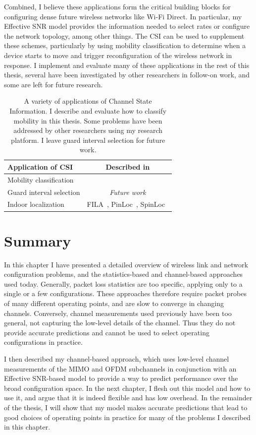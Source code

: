 Combined, I believe these applications form the critical building blocks for configuring dense future wireless networks like Wi-Fi Direct. In particular, my Effective SNR model provides the information needed to select rates or configure the network topology, among other things. The CSI can be used to supplement these schemes, particularly by using mobility classification to determine when a device starts to move and trigger reconfiguration of the wireless network in response. I implement and evaluate many of these applications in the rest of this thesis, several have been investigated by other researchers in follow-on work, and some are left for future research.

\begin{table}[tp]
	\centering
	\begin{tabular}{lc}
	\toprule
		Application of CSI & Described in \\
	\midrule
		Mobility classification & \chapref{chap:applications}\\
	    Guard interval selection & \emph{Future work}\\
		Indoor localization & FILA~\cite{Wu_FILA}, PinLoc~\cite{Sen_PinLoc}, SpinLoc~\cite{Sen_SpinLoc} \\ 
	\bottomrule
	\end{tabular}
	\caption[A variety of applications of Channel State Information]{\label{tab:csi_uses}A variety of applications of Channel State Information. I describe and evaluate how to classify mobility in this thesis. Some problems have been addressed by other researchers using my research platform. I leave guard interval selection for future work.}
\end{table}

\section{Summary}
In this chapter I have presented a detailed overview of wireless link and network configuration problems, and the statistics-based and channel-based approaches used today. Generally, packet loss statistics are too specific, applying only to a single or a few configurations. These approaches therefore require packet probes of many different operating points, and are slow to converge in changing channels. Conversely, channel measurements used previously have been too general, not capturing the low-level details of the channel. Thus they do not provide accurate predictions and cannot be used to select operating configurations in practice.

I then described my channel-based approach, which uses low-level channel measurements of the MIMO and OFDM subchannels in conjunction with an Effective SNR-based model to provide a way to predict performance over the broad configuration space. In the next chapter, I flesh out this model and how to use it, and argue that it is indeed flexible and has low overhead. In the remainder of the thesis, I will show that my model makes accurate predictions that lead to good choices of operating points in practice for many of the problems I described in this chapter.

\ifx\mainfile\undefined

\fi
